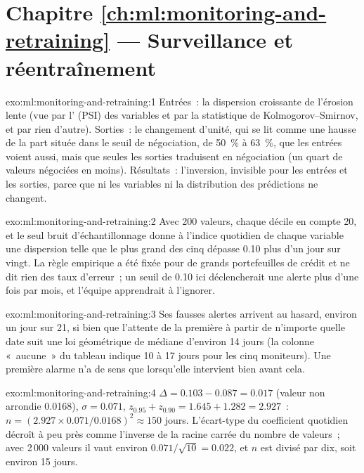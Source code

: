 \section*{Chapitre \ref{ch:ml:monitoring-and-retraining} --- Surveillance et réentraînement}

\begin{solution}{exo:ml:monitoring-and-retraining:1}
Entrées~: la dispersion croissante de l'érosion lente (vue par l' (PSI) des variables et par la statistique de Kolmogorov--Smirnov, et par rien d'autre). Sorties~:
le changement d'unité, qui se lit comme une hausse de la part située dans le seuil de négociation, de 50~\% à 63~\%, que les entrées voient aussi, mais que seules
les sorties traduisent en négociation (un quart de valeurs négociées en moins). Résultats~: l'inversion, invisible pour les entrées et les sorties, parce que
ni les variables ni la distribution des prédictions ne changent.
\end{solution}

\begin{solution}{exo:ml:monitoring-and-retraining:2}
Avec 200 valeurs, chaque décile en compte 20, et le seul bruit d'échantillonnage donne à l'indice quotidien de chaque variable une dispersion telle que le
plus grand des cinq dépasse 0.10 plus d'un jour sur vingt. La règle empirique a été fixée pour de grands portefeuilles de crédit et ne dit rien
des taux d'erreur~; un seuil de 0.10 ici déclencherait une alerte plus d'une fois par mois, et l'équipe apprendrait à l'ignorer.
\end{solution}

\begin{solution}{exo:ml:monitoring-and-retraining:3}
Ses fausses alertes arrivent au hasard, environ un jour sur 21, si bien que l'attente de la première à partir de n'importe quelle date suit une loi géométrique de médiane
d'environ 14 jours (la colonne «~aucune~» du tableau indique 10 à 17 jours pour les cinq moniteurs). Une première alarme n'a de sens que lorsqu'elle
intervient bien avant cela.
\end{solution}

\begin{solution}{exo:ml:monitoring-and-retraining:4}
$\Delta=0.103-0.087=0.017$ (valeur non arrondie 0.0168), $\sigma=0.071$, $z_{0.95}+z_{0.90}=1.645+1.282=2.927$~: $n=(2.927\times0.071/0.0168)^2
\approx150$ jours. L'écart-type du coefficient quotidien décroît à peu près comme l'inverse de la racine carrée du nombre de valeurs~;
avec 2\,000 valeurs il vaut environ $0.071/\sqrt{10}=0.022$, et $n$ est divisé par dix, soit environ 15 jours.
\end{solution}

